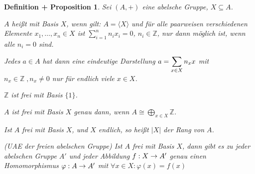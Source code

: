 \documentclass[a4paper,10pt,german]{scrbook}
\theoremstyle{saetze}
\theoremstyle{definitionen}
\newtheorem{DefProp}[Def]{Definition + Proposition}
\begin{document}
\begin{DefProp}
    \label{1.18}
    Sei $(A,+)$ eine abelsche Gruppe, $X \subseteq A$.
    \begin{enum}
        \item $A$ heißt  mit Basis $X$, wenn gilt: $A=\langle X\rangle$ und für alle paarweisen verschiedenen Elemente $x_1,\ldots,x_n\in X$ ist $\sum_{i=1}^n n_i x_i = 0$, $n_i \in \mathbb Z$, nur dann möglich ist, wenn alle $n_i=0$ sind.
	
	Jedes $a \in A$ hat dann eine eindeutige Darstellung $\displaystyle a = \sum_{x\in X} n_x x$ mit
        $n_x \in \mathbb{Z}\;, n_x \neq 0$ nur für endlich viele $x \in X$.
	

	\item $\mathbb Z$ ist frei mit Basis $\{1\}$.

	\item $A$ ist frei mit Basis $X$ genau dann, wenn $A \cong \bigoplus_{x\in X}\mathbb Z$.
	\item Ist $A$ frei mit Basis $X$, und $X$ endlich, so heißt $|X|$ der Rang von $A$.

        \item (UAE der freien abelschen Gruppe) \newline
        Ist $A$ frei mit Basis $X$, dann gibt es zu jeder abelschen Gruppe $A'$ und jeder Abbildung $f:X \rightarrow A'$
        genau einen Homomorphismus $\varphi: A\rightarrow A'$ mit $\forall x
        \in X: \varphi(x) = f(x)$ \newline
    \end{enum}



\end{DefProp} 
\end{document}
